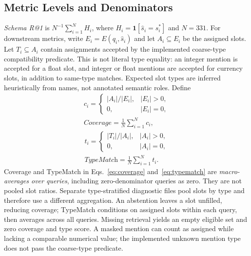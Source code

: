 \documentclass[pdflatex,iicol,sn-basic,Numbered]{sn-jnl}
\begin{document}
\subsection{Metric Levels and Denominators}\label{subsec:metrics}
\textit{Schema R@1} is $N^{-1}\sum_{i=1}^N H_i$, where $H_i=\mathbf{1}[\hat{s}_i=s_i^*]$ and $N=331$. For downstream metrics, write $E_i=E(q_i,\hat{s}_i)$ and let $A_i\subseteq E_i$ be the assigned slots. Let $T_i\subseteq A_i$ contain assignments accepted by the implemented coarse-type compatibility predicate. This is not literal type equality: an integer mention is accepted for a float slot, and integer or float mentions are accepted for currency slots, in addition to same-type matches. Expected slot types are inferred heuristically from names, not annotated semantic roles. Define
\begin{equation}
\begin{gathered}
c_i=\begin{cases}|A_i|/|E_i|,& |E_i|>0,\\0,& |E_i|=0,\end{cases}
\\[3pt]
\textit{Coverage}=\frac{1}{N}\sum_{i=1}^N c_i,
\end{gathered}
\label{eq:coverage}
\end{equation}
\begin{equation}
\begin{gathered}
t_i=\begin{cases}|T_i|/|A_i|,& |A_i|>0,\\0,& |A_i|=0,\end{cases}
\\[3pt]
\textit{TypeMatch}=\frac{1}{N}\sum_{i=1}^N t_i.
\end{gathered}
\label{eq:typematch}
\end{equation}
Coverage and TypeMatch in Eqs.~\eqref{eq:coverage} and~\eqref{eq:typematch} are \emph{macro-averages over queries}, including zero-denominator queries as zero. They are not pooled slot ratios. Separate type-stratified diagnostic files pool slots by type and therefore use a different aggregation. An abstention leaves a slot unfilled, reducing coverage; TypeMatch conditions on assigned slots within each query, then averages across all queries. Missing retrieval yields an empty eligible set and zero coverage and type score. A masked mention can count as assigned while lacking a comparable numerical value; the implemented unknown mention type does not pass the coarse-type predicate.
\end{document}
